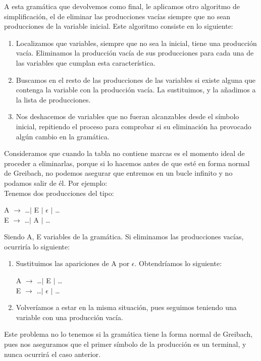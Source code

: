 \documentclass[12pt,a4paper,spanish]{book}
\begin{document}
A esta gram\'atica que devolvemos como final, le aplicamos otro algoritmo de simplificaci\'on, el de eliminar las producciones vac\'ias siempre que no sean producciones de la variable inicial. 
Este algoritmo consiste en lo siguiente:
\begin{enumerate}
\item Localizamos que variables, siempre que no sea la inicial, tiene una producci\'on vac\'ia. Eliminamos la producci\'on vac\'ia de sus producciones para cada una de las variables que cumplan esta caracter\'istica.
\item Buscamos en el resto de las producciones de las variables si existe alguna que contenga la variable con la producci\'on vac\'ia. La sustituimos, y la a\~nadimos a la lista de producciones.
\item Nos deshacemos de variables que no fueran alcanzables desde el s\'imbolo inicial, repitiendo el proceso para comprobar si su eliminaci\'on ha provocado alg\'un cambio en la gram\'atica.
\end{enumerate}
Consideramos que cuando la tabla no contiene marcas es el momento ideal de proceder a eliminarlas, porque si lo hacemos antes de que est\'e en forma normal de Greibach, no podemos asegurar que entremos en un bucle infinito y no podamos salir de \'el. Por ejemplo:\\
Tenemos dos producciones del tipo:\\
\begin{center}
A $\rightarrow$ \ldots $\mid$ E $\mid$ $\epsilon$ $\mid$ \ldots\\
E $\rightarrow$ \ldots $\mid$ A $\mid$ \ldots\\
\end{center}
Siendo A, E variables de la gram\'atica. Si eliminamos las producciones vac\'ias, ocurrir\'ia lo siguiente:\\
\begin{enumerate}	
\item Sustituimos  las apariciones de A por $\epsilon$. Obtendr\'iamos lo siguiente:\\
\begin{center}
	A $\rightarrow$ \ldots $\mid$ E $\mid$ \ldots\\
	E $\rightarrow$ \ldots $\mid$ $\epsilon$ $\mid$ \ldots\\
\end{center}
\item Volver\'iamos a estar en la misma situaci\'on, pues seguimos teniendo una variable con una producci\'on vac\'ia.
\end{enumerate}
Este problema no lo tenemos si la gram\'atica tiene la forma normal de Greibach, pues nos aseguramos que el primer s\'imbolo de la producci\'on es un terminal, y nunca ocurrir\'a el caso anterior. 
\end{document}
